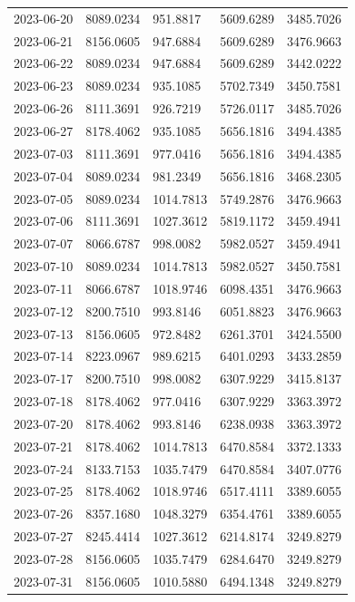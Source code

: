 {\begin{longtable}{lllll}
2023-06-20 & 8089.0234 & 951.8817 & 5609.6289 & 3485.7026 \\
2023-06-21 & 8156.0605 & 947.6884 & 5609.6289 & 3476.9663 \\
2023-06-22 & 8089.0234 & 947.6884 & 5609.6289 & 3442.0222 \\
2023-06-23 & 8089.0234 & 935.1085 & 5702.7349 & 3450.7581 \\
2023-06-26 & 8111.3691 & 926.7219 & 5726.0117 & 3485.7026 \\
2023-06-27 & 8178.4062 & 935.1085 & 5656.1816 & 3494.4385 \\
2023-07-03 & 8111.3691 & 977.0416 & 5656.1816 & 3494.4385 \\
2023-07-04 & 8089.0234 & 981.2349 & 5656.1816 & 3468.2305 \\
2023-07-05 & 8089.0234 & 1014.7813 & 5749.2876 & 3476.9663 \\
2023-07-06 & 8111.3691 & 1027.3612 & 5819.1172 & 3459.4941 \\
2023-07-07 & 8066.6787 & 998.0082 & 5982.0527 & 3459.4941 \\
2023-07-10 & 8089.0234 & 1014.7813 & 5982.0527 & 3450.7581 \\
2023-07-11 & 8066.6787 & 1018.9746 & 6098.4351 & 3476.9663 \\
2023-07-12 & 8200.7510 & 993.8146 & 6051.8823 & 3476.9663 \\
2023-07-13 & 8156.0605 & 972.8482 & 6261.3701 & 3424.5500 \\
2023-07-14 & 8223.0967 & 989.6215 & 6401.0293 & 3433.2859 \\
2023-07-17 & 8200.7510 & 998.0082 & 6307.9229 & 3415.8137 \\
2023-07-18 & 8178.4062 & 977.0416 & 6307.9229 & 3363.3972 \\
2023-07-20 & 8178.4062 & 993.8146 & 6238.0938 & 3363.3972 \\
2023-07-21 & 8178.4062 & 1014.7813 & 6470.8584 & 3372.1333 \\
2023-07-24 & 8133.7153 & 1035.7479 & 6470.8584 & 3407.0776 \\
2023-07-25 & 8178.4062 & 1018.9746 & 6517.4111 & 3389.6055 \\
2023-07-26 & 8357.1680 & 1048.3279 & 6354.4761 & 3389.6055 \\
2023-07-27 & 8245.4414 & 1027.3612 & 6214.8174 & 3249.8279 \\
2023-07-28 & 8156.0605 & 1035.7479 & 6284.6470 & 3249.8279 \\
2023-07-31 & 8156.0605 & 1010.5880 & 6494.1348 & 3249.8279 \\

\end{longtable}}
